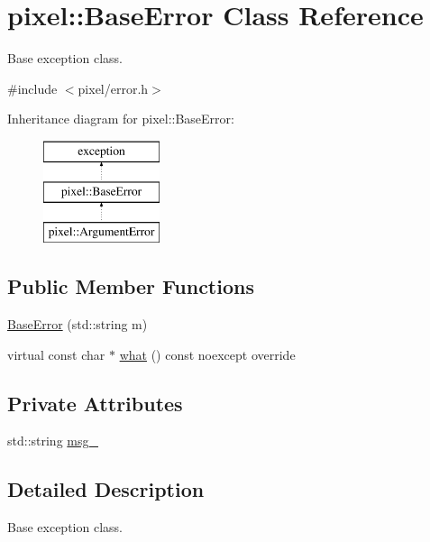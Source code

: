 \hypertarget{classpixel_1_1_base_error}{}\section{pixel\+:\+:Base\+Error Class Reference}
\label{classpixel_1_1_base_error}


Base exception class.  




{\ttfamily \#include $<$pixel/error.\+h$>$}

Inheritance diagram for pixel\+:\+:Base\+Error\+:\begin{figure}[H]
\begin{center}
\leavevmode
\includegraphics[height=3.000000cm]{classpixel_1_1_base_error}
\end{center}
\end{figure}
\subsection*{Public Member Functions}
\begin{DoxyCompactItemize}
\item 
\hyperlink{classpixel_1_1_base_error_aee0432935f72987286c9d4518642269e}{Base\+Error} (std\+::string m)
\item 
virtual const char $\ast$ \hyperlink{classpixel_1_1_base_error_a7e3a7f00803f17d146be69cb0f8e3f95}{what} () const noexcept override
\end{DoxyCompactItemize}
\subsection*{Private Attributes}
\begin{DoxyCompactItemize}
\item 
std\+::string \hyperlink{classpixel_1_1_base_error_a237babe03722b7f9c1ae03819bf88754}{msg\+\_\+}
\end{DoxyCompactItemize}


\subsection{Detailed Description}
Base exception class. 

